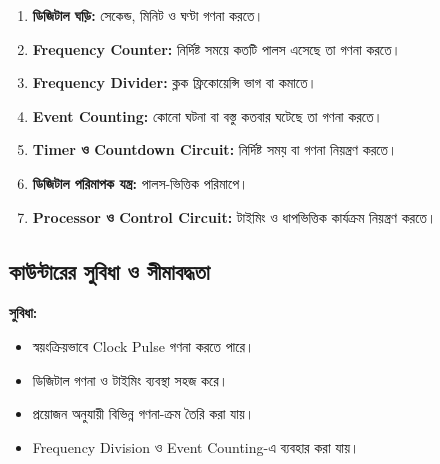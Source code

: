 \begin{enumerate}[leftmargin=*,itemsep=2pt]

    \item \textbf{ডিজিটাল ঘড়ি:}
    সেকেন্ড, মিনিট ও ঘণ্টা গণনা করতে।

    \item \textbf{\textenglish{Frequency Counter}:}
    নির্দিষ্ট সময়ে কতটি পালস এসেছে তা গণনা করতে।

    \item \textbf{\textenglish{Frequency Divider}:}
    ক্লক ফ্রিকোয়েন্সি ভাগ বা কমাতে।

    \item \textbf{\textenglish{Event Counting}:}
    কোনো ঘটনা বা বস্তু কতবার ঘটেছে তা গণনা করতে।

    \item \textbf{\textenglish{Timer} ও \textenglish{Countdown Circuit}:}
    নির্দিষ্ট সময় বা গণনা নিয়ন্ত্রণ করতে।

    \item \textbf{ডিজিটাল পরিমাপক যন্ত্র:}
    পালস-ভিত্তিক পরিমাপে।

    \item \textbf{\textenglish{Processor} ও
    \textenglish{Control Circuit}:}
    টাইমিং ও ধাপভিত্তিক কার্যক্রম নিয়ন্ত্রণ করতে।

\end{enumerate}



\subsection{কাউন্টারের সুবিধা ও সীমাবদ্ধতা}

\textbf{সুবিধা:}

\begin{itemize}[label={{\bulletfont\textbullet}}, leftmargin=*, nosep]
    \item স্বয়ংক্রিয়ভাবে \textenglish{Clock Pulse} গণনা করতে পারে।

    \item ডিজিটাল গণনা ও টাইমিং ব্যবস্থা সহজ করে।

    \item প্রয়োজন অনুযায়ী বিভিন্ন গণনা-ক্রম তৈরি করা যায়।

    \item \textenglish{Frequency Division} ও
    \textenglish{Event Counting}-এ ব্যবহার করা যায়।

\end{itemize}

